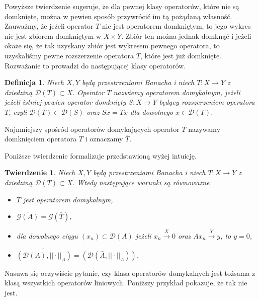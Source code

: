 \documentclass[12pt]{article}
\newtheorem{tw}{Twierdzenie}
\newtheorem{df}{Definicja}
\begin{document}
Powyższe twierdzenie sugeruje, że dla pewnej klasy operatorów, które nie są domknięte, można w pewien sposób przywrócić im tą pożądaną własność. Zauważmy, że jeżeli operator $T$ nie jest operatorem domkniętym, to jego wykres nie jest zbiorem domkniętym w $X\times Y$. Zbiór ten  można jednak domknąć i jeżeli okaże się, że tak uzyskany zbiór jest wykresem pewnego operatora, to uzyskaliśmy pewne rozszerzenie operatora $T$, które jest już domknięte. Rozważanie to prowadzi do następującej klasy operatorów.
\begin{df}
	Niech $X,Y$ będą przestrzeniami Banacha i niech $T\colon X\to Y$ z dziedziną $\mathcal{D}(T) \subset X$. Operator $T$ nazwiemy operatorem domykalnym, jeżeli jeżeli istniej pewien operator domknięty $S\colon X\to Y$ będący rozszerzeniem operatora $T$, czyli $\mathcal{D}(T) \subset \mathcal{D}(S)$ oraz $Sx=Tx$ dla dowolnego $x\in \mathcal{D}(T)$.
\end{df}

Najmniejszy spośród operatorów domykających operator $T$ nazywamy domknięciem operatora $T$ i oznaczamy $\bar{T}$.

Poniższe twierdzenie formalizuje przedstawioną wyżej intuicję.

\begin{tw}
	Niech $X,Y$ będą przestrzeniami Banacha i niech $T\colon X\to Y$ z dziedziną $\mathcal{D}(T) \subset X$. Wtedy następujące warunki są równoważne
	\begin{itemize}
		\item $T$ jest operatorem domykalnym,
		\item $\overline{\mathcal{G}(A)} = \mathcal{G}(\bar{T})$,
		\item dla dowolnego ciągu $(x_n) \subset \mathcal{D}(A)$ jeżeli $x_n \stackrel{X}{\to} 0$ oraz $Ax_n\stackrel{Y}{\to} y$, to $y = 0$,
		\item $\widetilde{\left(\mathcal{D}(A), ||\cdot||_A\right)} = \left(\mathcal{D}(\bar{A}, ||\cdot||_A)\right)$.
	\end{itemize}
\end{tw}

Nasuwa się oczywiście pytanie, czy klasa operatorów domykalnych jest tożsama z klasą wszystkich operatorów liniowych. Poniższy przykład pokazuje, że tak nie jest.
\end{document}
